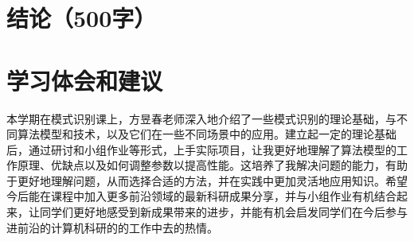 \documentclass{article}
\begin{document}
\section{结论（500字）}


\section{学习体会和建议}
本学期在模式识别课上，方昱春老师深入地介绍了一些模式识别的理论基础，与不同算法模型和技术，以及它们在一些不同场景中的应用。建立起一定的理论基础后，通过研讨和小组作业等形式，上手实际项目，让我更好地理解了算法模型的工作原理、优缺点以及如何调整参数以提高性能。这培养了我解决问题的能力，有助于更好地理解问题，从而选择合适的方法，并在实践中更加灵活地应用知识。希望今后能在课程中加入更多前沿领域的最新科研成果分享，并与小组作业有机结合起来，让同学们更好地感受到新成果带来的进步，并能有机会启发同学们在今后参与进前沿的计算机科研的的工作中去的热情。



\newpage{}
\appendix
\end{document}
